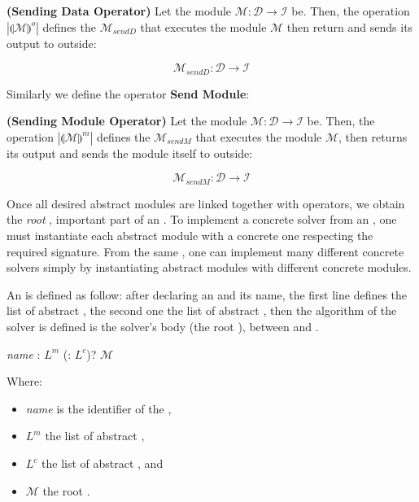 \begin{definition}\label{op:osend}
{\bf (Sending Data Operator)} Let the module $\mathcal{M} : \mathcal{D} \rightarrow \mathcal{I}$ be. Then, the operation $\left|\llparenthesis \mathcal{M}\rrparenthesis^{o}\right|$ defines the \cm{} $\mathcal{M}_{sendD}$ that executes the module $\mathcal{M}$ then return and sends its output to outside:

\[
\mathcal{M}_{sendD}:\mathcal{D} \rightarrow \mathcal{I}
\]
\end{definition}

Similarly we define the operator \textbf{Send Module}:

\begin{definition}\label{op:msend}
{\bf (Sending Module Operator)} Let the module $\mathcal{M} : \mathcal{D} \rightarrow \mathcal{I}$ be. Then, the operation $\left|\llparenthesis \mathcal{M}\rrparenthesis^{m}\right|$ defines the \cm{} $\mathcal{M}_{sendM}$ that executes the module $\mathcal{M}$, then returns its output and sends the module itself to outside:

\[
\mathcal{M}_{sendM}:\mathcal{D} \rightarrow \mathcal{I}
\]
\end{definition}

Once all desired abstract modules are linked together with operators, we obtain the {\it root} \cm{}, important part of an \as. To implement a concrete solver from an \as, one must instantiate each abstract module with a concrete one respecting the required signature. From the same \as, one can implement many different concrete solvers simply by instantiating abstract modules with different concrete modules.

An \as{} is defined as follow: after declaring an \mbox{} and its name, the first line defines the list of abstract \oms, the second one the list of abstract \opchs, then the algorithm of the solver is defined is the solver's body (the root \cm), between \mbox{} and \mbox{}.


\begin{center}
 {\it name} : $L^m$ (: $L^c$)?  $\mathcal{M}$ 
\end{center}

Where:
\begin{itemize}
\item {\it name} is the identifier of the \as{}, 
\item $L^m$ the list of abstract \oms{},
\item $L^c$ the list of abstract \opchs{}, and
\item $\mathcal{M}$ the root \cm.
\end{itemize}

